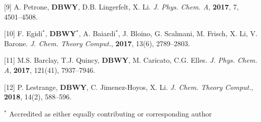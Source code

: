 \documentclass[usepdftitle=false]{beamer}
\newcommand{\me}[0]{{\bf DBWY}}
\begin{document}
\begin{frame}
{{      [9] A. Petrone, \me, D.B. Lingerfelt,  X. Li.
	\emph{J. Phys. Chem. A}, \textbf{2017}, 7, 4501--4508.
      
      [10] F. Egidi$^*$, \me$^*$, A. Baiardi$^*$, J. Bloino, G. Scalmani, M. Frisch, X. Li,
      V. Barone.
	\emph{J. Chem. Theory Comput.}, \textbf{2017}, 13(6), 2789--2803.

      [11] M.S. Barclay, T.J. Quincy, \me, M. Caricato, C.G. Elles.
	\emph{J. Phys. Chem. A}, \textbf{2017}, 121(41), 7937--7946.

      [12] P. Lestrange, \me, C. Jimenez-Hoyos, X. Li.
	\emph{J. Chem. Theory Comput.}, \textbf{2018}, 14(2), 588--596.

      }

  \vspace{0.5cm}
  \begin{minipage}[b]{\textwidth}
    \tiny $^*$ Accredited as either equally contributing or corresponding
    author
  \end{minipage}
    }


\end{frame}
\end{document}
